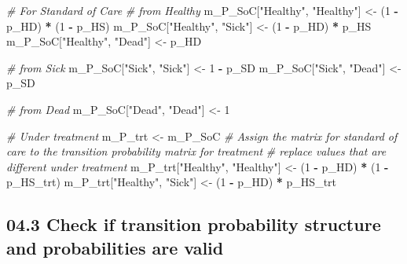 \documentclass[]{article}
\newenvironment{Shaded}{\begin{snugshade}}{\end{snugshade}}
\newcommand{\DecValTok}[1]{\textcolor[rgb]{0.00,0.00,0.81}{#1}}
\newcommand{\StringTok}[1]{\textcolor[rgb]{0.31,0.60,0.02}{#1}}
\newcommand{\CommentTok}[1]{\textcolor[rgb]{0.56,0.35,0.01}{\textit{#1}}}
\newcommand{\OperatorTok}[1]{\textcolor[rgb]{0.81,0.36,0.00}{\textbf{#1}}}
\newcommand{\NormalTok}[1]{#1}
\begin{document}
\begin{Shaded}
\begin{Highlighting}[]
\CommentTok{# For Standard of Care }
\CommentTok{# from Healthy}
\NormalTok{m_P_SoC[}\StringTok{"Healthy"}\NormalTok{, }\StringTok{"Healthy"}\NormalTok{] <-}\StringTok{ }\NormalTok{(}\DecValTok{1} \OperatorTok{-}\StringTok{ }\NormalTok{p_HD) }\OperatorTok{*}\StringTok{ }\NormalTok{(}\DecValTok{1} \OperatorTok{-}\StringTok{ }\NormalTok{p_HS)}
\NormalTok{m_P_SoC[}\StringTok{"Healthy"}\NormalTok{, }\StringTok{"Sick"}\NormalTok{]    <-}\StringTok{ }\NormalTok{(}\DecValTok{1} \OperatorTok{-}\StringTok{ }\NormalTok{p_HD) }\OperatorTok{*}\StringTok{ }\NormalTok{p_HS}
\NormalTok{m_P_SoC[}\StringTok{"Healthy"}\NormalTok{, }\StringTok{"Dead"}\NormalTok{]    <-}\StringTok{ }\NormalTok{p_HD}

\CommentTok{# from Sick}
\NormalTok{m_P_SoC[}\StringTok{"Sick"}\NormalTok{, }\StringTok{"Sick"}\NormalTok{] <-}\StringTok{ }\DecValTok{1} \OperatorTok{-}\StringTok{ }\NormalTok{p_SD}
\NormalTok{m_P_SoC[}\StringTok{"Sick"}\NormalTok{, }\StringTok{"Dead"}\NormalTok{] <-}\StringTok{ }\NormalTok{p_SD}

\CommentTok{# from Dead}
\NormalTok{m_P_SoC[}\StringTok{"Dead"}\NormalTok{, }\StringTok{"Dead"}\NormalTok{] <-}\StringTok{ }\DecValTok{1}

\CommentTok{# Under treatment}
\NormalTok{m_P_trt <-}\StringTok{ }\NormalTok{m_P_SoC  }\CommentTok{# Assign the matrix for standard of care to the transition probability matrix for treatment}
\CommentTok{# replace values that are different under treatment }
\NormalTok{m_P_trt[}\StringTok{"Healthy"}\NormalTok{, }\StringTok{"Healthy"}\NormalTok{] <-}\StringTok{ }\NormalTok{(}\DecValTok{1} \OperatorTok{-}\StringTok{ }\NormalTok{p_HD) }\OperatorTok{*}\StringTok{ }\NormalTok{(}\DecValTok{1} \OperatorTok{-}\StringTok{ }\NormalTok{p_HS_trt)}
\NormalTok{m_P_trt[}\StringTok{"Healthy"}\NormalTok{, }\StringTok{"Sick"}\NormalTok{]    <-}\StringTok{ }\NormalTok{(}\DecValTok{1} \OperatorTok{-}\StringTok{ }\NormalTok{p_HD) }\OperatorTok{*}\StringTok{ }\NormalTok{p_HS_trt}
\end{Highlighting}
\end{Shaded}

\subsection{04.3 Check if transition probability structure and
probabilities are
valid}\label{check-if-transition-probability-structure-and-probabilities-are-valid}
\end{document}
